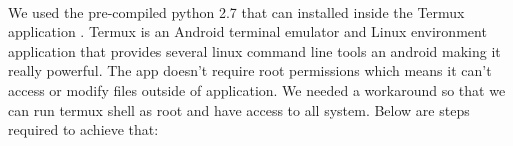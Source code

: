\documentclass[../main.tex]{subfile}
\begin{document}
		\paragraph{} We used the pre-compiled python 2.7 that can installed inside the Termux application \cite{termux_website}. Termux is an Android terminal emulator and Linux environment application that provides several linux command line tools an android making it really powerful. The app doesn't require root permissions which means it can't access or modify files outside of application. We needed a workaround so that we can run termux shell as root and have access to all system. Below are steps required to achieve that:	
		
		
\end{document}
